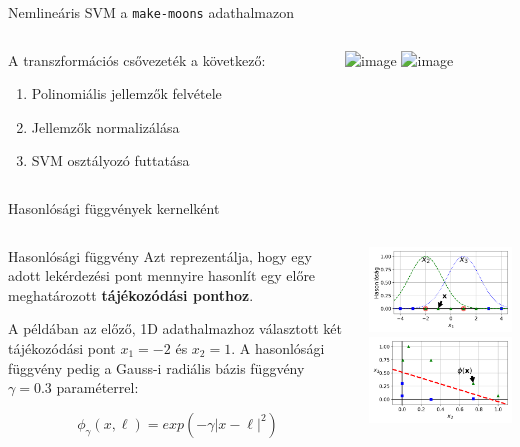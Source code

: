 \documentclass[english, aspectratio=169]{beamer}
\begin{document}
\begin{frame}{Nemlineáris SVM a \texttt{make-moons} adathalmazon}
\begin{columns}
\begin{column}{.5\textwidth}
A transzformációs csővezeték a következő:
\begin{enumerate}
	\item Polinomiális jellemzők felvétele
	\item Jellemzők normalizálása
	\item SVM osztályozó futtatása
\end{enumerate}
\end{column}
\begin{column}{.5\textwidth}
\begin{center}
\includegraphics<1>[width=7cm, height=7cm, keepaspectratio]{images/svm_11.png}
\includegraphics<2>[width=7cm, height=7cm, keepaspectratio]{images/svm_28.png}
\end{center}
\end{column}
\end{columns}
\end{frame}

\begin{frame}{Hasonlósági függvények kernelként}
\begin{columns}
\begin{column}{.5\textwidth}
\begin{block}{Hasonlósági függvény}
Azt reprezentálja, hogy egy adott lekérdezési pont mennyire hasonlít egy előre meghatározott \textbf{tájékozódási ponthoz}.
\end{block}
A példában az előző, 1D adathalmazhoz választott két tájékozódási pont $x_1=-2$ és $x_2=1$. A hasonlósági függvény pedig a Gauss-i radiális bázis függvény $\gamma=0.3$ paraméterrel:
\begin{block}{}
\[
\phi_\gamma \left( x, \ell \right) = exp\left( -\gamma \left| x - \ell \right|^2 \right)
\]
\end{block}
\end{column}
\begin{column}{.5\textwidth}
\begin{center}
\includegraphics[width=6cm, keepaspectratio]{images/svm_14.png}
\includegraphics[width=6cm, keepaspectratio]{images/svm_15.png}
\end{center}
\end{column}
\end{columns}
\end{frame}
\end{document}
